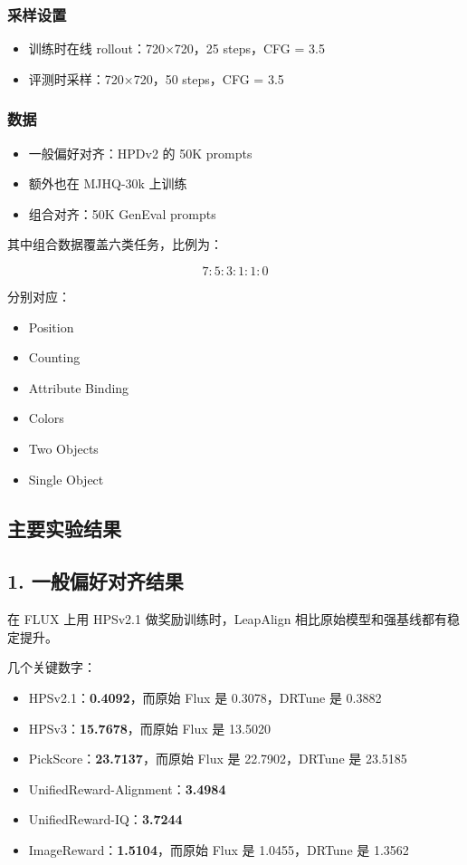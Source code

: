 \subsubsection{采样设置}

\begin{itemize}[leftmargin=1.5em]
  \item 训练时在线 rollout：720×720，25 steps，CFG = 3.5
  \item 评测时采样：720×720，50 steps，CFG = 3.5
\end{itemize}

\subsubsection{数据}

\begin{itemize}[leftmargin=1.5em]
  \item 一般偏好对齐：HPDv2 的 50K prompts
  \item 额外也在 MJHQ-30k 上训练
  \item 组合对齐：50K GenEval prompts
\end{itemize}

其中组合数据覆盖六类任务，比例为：

\[
7:5:3:1:1:0
\]

分别对应：

\begin{itemize}[leftmargin=1.5em]
  \item Position
  \item Counting
  \item Attribute Binding
  \item Colors
  \item Two Objects
  \item Single Object
\end{itemize}

\subsection{主要实验结果}

\subsection{1. 一般偏好对齐结果}

在 FLUX 上用 HPSv2.1 做奖励训练时，LeapAlign 相比原始模型和强基线都有稳定提升。

几个关键数字：

\begin{itemize}[leftmargin=1.5em]
  \item HPSv2.1：\textbf{0.4092}，而原始 Flux 是 0.3078，DRTune 是 0.3882
  \item HPSv3：\textbf{15.7678}，而原始 Flux 是 13.5020
  \item PickScore：\textbf{23.7137}，而原始 Flux 是 22.7902，DRTune 是 23.5185
  \item UnifiedReward-Alignment：\textbf{3.4984}
  \item UnifiedReward-IQ：\textbf{3.7244}
  \item ImageReward：\textbf{1.5104}，而原始 Flux 是 1.0455，DRTune 是 1.3562
\end{itemize}

